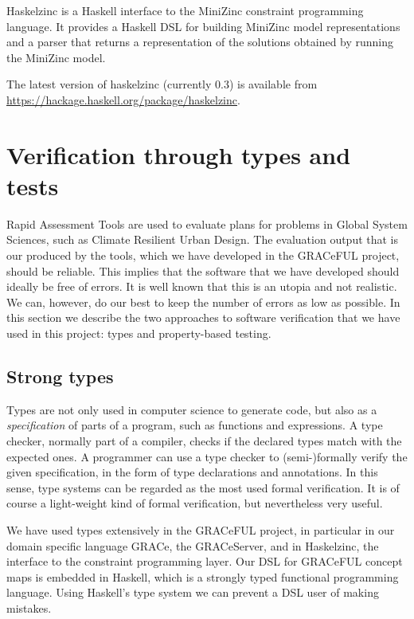 \documentclass{article}
\begin{document}
Haskelzinc is a Haskell interface to the MiniZinc constraint
programming language.
%
It provides a Haskell DSL for building MiniZinc model representations and a parser that returns a representation of the solutions obtained
by running the MiniZinc model.

The latest version of haskelzinc (currently 0.3) is available from
\url{https://hackage.haskell.org/package/haskelzinc}.


\section{Verification through types and tests}
\label{sec:verification}

Rapid Assessment Tools are used to evaluate plans for problems in Global System
Sciences, such as Climate Resilient Urban Design. The evaluation output that is
our produced by the tools, which we have developed in the GRACeFUL project,
should be reliable. This implies that the software that we have developed should
ideally be free of errors. It is well known that this is an utopia and not
realistic. We can, however, do our best to keep the number of errors as low as
possible. In this section we describe the two approaches to software
verification that we have used in this project: types and property-based
testing. 

\subsection{Strong types}

Types are not only used in computer science to generate code, but also as a
\emph{specification} of parts of a program, such as functions and expressions. A
type checker, normally part of a compiler, checks if the declared types match
with the expected ones. A programmer can use a type checker to (semi-)formally
verify the given specification, in the form of type declarations and
annotations. In this sense, type systems can be regarded as the most used
formal verification. It is of course a light-weight kind of formal verification,
but nevertheless very useful. 

We have used types extensively in the GRACeFUL project, in particular in our
domain specific language GRACe, the GRACeServer, and in Haskelzinc, the
interface to the constraint programming layer. Our DSL for GRACeFUL concept maps
is embedded in Haskell, which is a strongly typed functional programming
language. Using Haskell's type system we can prevent a DSL user of making
mistakes.
\end{document}
